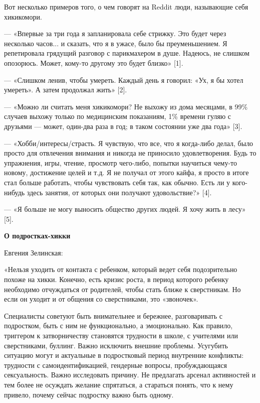 Вот несколько примеров того, о чем говорят на Reddit люди, называющие себя хикикомори.

\setlength{\leftskip}{2cm}


--- «Впервые за три года я запланировала себе стрижку. Это будет через несколько часов... и сказать, что я в ужасе, было бы преуменьшением. Я репетировала грядущий разговор с парикмахером в душе. Надеюсь, не слишком опозорюсь. Может, кому-то другому это будет близко» [1].

--- «Слишком ленив, чтобы умереть. Каждый день я говорил: «Ух, я бы хотел умереть». А затем продолжал жить» [2].

--- «Можно ли считать меня хикикомори? Не выхожу из дома месяцами, в 99\% случаев выхожу только по медицинским показаниям, 1\% времени гуляю с друзьями — может, один-два раза в год; в таком состоянии уже два года» [3].

--- «Хобби/интересы/страсть. Я чувствую, что все, что я когда-либо делал, было просто для отвлечения внимания и никогда не приносило удовлетворения. Будь то упражнения, игры, чтение, просмотр чего-либо, попытки научиться чему-то новому, достижение целей и т.д. Я не получал от этого кайфа, я просто в итоге стал больше работать, чтобы чувствовать себя так, как обычно. Есть ли у кого-нибудь здесь занятия, от которых они получают удовольствие?» [4].

--- «Я больше не могу выносить общество других людей. Я хочу жить в лесу» [5].

\setlength{\leftskip}{0cm}


\textbf{О подростках-хикки}

Евгения Зелинская:

\setlength{\leftskip}{2cm}

«Нельзя уходить от контакта с ребенком, который ведет себя подозрительно похоже на хикки. Конечно, есть кризис роста, в период которого ребенку необходимо отчуждаться от родителей, чтобы стать ближе к сверстникам. Но если он уходит и от общения со сверстниками, это «звоночек».

Специалисты советуют быть внимательнее и бережнее, разговаривать с подростком, быть с ним не функционально, а эмоционально. Как правило, триггером к затворничеству становятся трудности в школе, с учителями или сверстниками, буллинг. Важно исключить внешние проблемы. Усугубить ситуацию могут и актуальные в подростковый период внутренние конфликты: трудности с самоидентификацией, гендерные вопросы, пробуждающаяся сексуальность. Важно исследовать причину. Не предлагать арсенал активностей и тем более не осуждать желание спрятаться, а стараться понять, что к нему привело, почему сейчас подростку важно быть одному.

